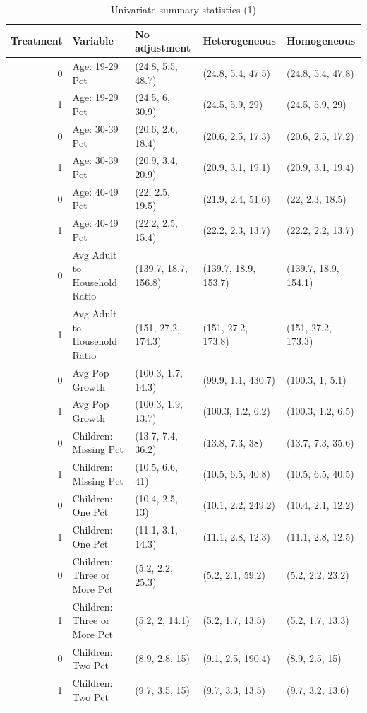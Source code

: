 \begin{table}[h!]
\centering
    \caption{Univariate summary statistics (1)}
    \label{tab:summarytab1}
\begin{tabular}{rllll}
  \hline
Treatment & Variable & No adjustment & Heterogeneous & Homogeneous \\ 
  \hline
0 & Age: 19-29 Pct & (24.8, 5.5, 48.7) & (24.8, 5.4, 47.5) & (24.8, 5.4, 47.8) \\ 
  1 & Age: 19-29 Pct & (24.5, 6, 30.9) & (24.5, 5.9, 29) & (24.5, 5.9, 29) \\ 
  0 & Age: 30-39 Pct & (20.6, 2.6, 18.4) & (20.6, 2.5, 17.3) & (20.6, 2.5, 17.2) \\ 
  1 & Age: 30-39 Pct & (20.9, 3.4, 20.9) & (20.9, 3.1, 19.1) & (20.9, 3.1, 19.4) \\ 
  0 & Age: 40-49 Pct & (22, 2.5, 19.5) & (21.9, 2.4, 51.6) & (22, 2.3, 18.5) \\ 
  1 & Age: 40-49 Pct & (22.2, 2.5, 15.4) & (22.2, 2.3, 13.7) & (22.2, 2.2, 13.7) \\ 
  0 & Avg Adult to Household Ratio & (139.7, 18.7, 156.8) & (139.7, 18.9, 153.7) & (139.7, 18.9, 154.1) \\ 
  1 & Avg Adult to Household Ratio & (151, 27.2, 174.3) & (151, 27.2, 173.8) & (151, 27.2, 173.3) \\ 
  0 & Avg Pop Growth & (100.3, 1.7, 14.3) & (99.9, 1.1, 430.7) & (100.3, 1, 5.1) \\ 
  1 & Avg Pop Growth & (100.3, 1.9, 13.7) & (100.3, 1.2, 6.2) & (100.3, 1.2, 6.5) \\ 
  0 & Children: Missing Pct & (13.7, 7.4, 36.2) & (13.8, 7.3, 38) & (13.7, 7.3, 35.6) \\ 
  1 & Children: Missing Pct & (10.5, 6.6, 41) & (10.5, 6.5, 40.8) & (10.5, 6.5, 40.5) \\ 
  0 & Children: One Pct & (10.4, 2.5, 13) & (10.1, 2.2, 249.2) & (10.4, 2.1, 12.2) \\ 
  1 & Children: One Pct & (11.1, 3.1, 14.3) & (11.1, 2.8, 12.3) & (11.1, 2.8, 12.5) \\ 
  0 & Children: Three or More Pct & (5.2, 2.2, 25.3) & (5.2, 2.1, 59.2) & (5.2, 2.2, 23.2) \\ 
  1 & Children: Three or More Pct & (5.2, 2, 14.1) & (5.2, 1.7, 13.5) & (5.2, 1.7, 13.3) \\ 
  0 & Children: Two Pct & (8.9, 2.8, 15) & (9.1, 2.5, 190.4) & (8.9, 2.5, 15) \\ 
  1 & Children: Two Pct & (9.7, 3.5, 15) & (9.7, 3.3, 13.5) & (9.7, 3.2, 13.6) \\ 

\end{tabular}
\end{table}
